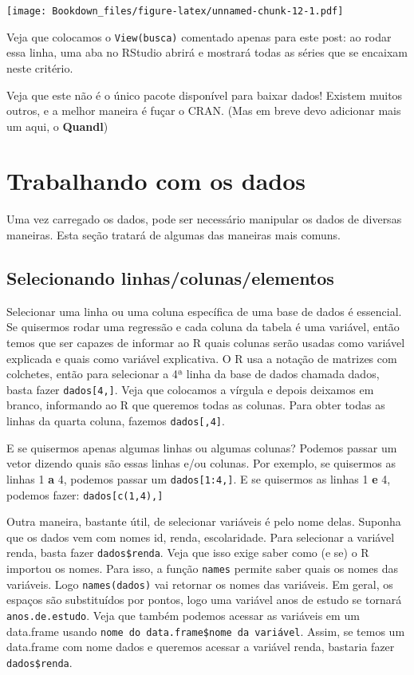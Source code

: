 \documentclass[]{book}
\begin{document}
\texttt{[image: Bookdown\_files/figure-latex/unnamed-chunk-12-1.pdf]}

Veja que colocamos o \texttt{View(busca)} comentado apenas para este
post: ao rodar essa linha, uma aba no RStudio abrirá e mostrará todas as
séries que se encaixam neste critério.

Veja que este não é o único pacote disponível para baixar dados! Existem
muitos outros, e a melhor maneira é fuçar o CRAN. (Mas em breve devo
adicionar mais um aqui, o \textbf{Quandl})

\section{Trabalhando com os dados}\label{trabalhando-com-os-dados}

Uma vez carregado os dados, pode ser necessário manipular os dados de
diversas maneiras. Esta seção tratará de algumas das maneiras mais
comuns.

\subsection{Selecionando
linhas/colunas/elementos}\label{selecionando-linhascolunaselementos}

Selecionar uma linha ou uma coluna específica de uma base de dados é
essencial. Se quisermos rodar uma regressão e cada coluna da tabela é
uma variável, então temos que ser capazes de informar ao R quais colunas
serão usadas como variável explicada e quais como variável explicativa.
O R usa a notação de matrizes com colchetes, então para selecionar a 4ª
linha da base de dados chamada dados, basta fazer
\texttt{dados{[}4,{]}}. Veja que colocamos a vírgula e depois deixamos
em branco, informando ao R que queremos todas as colunas. Para obter
todas as linhas da quarta coluna, fazemos \texttt{dados{[},4{]}}.

E se quisermos apenas algumas linhas ou algumas colunas? Podemos passar
um vetor dizendo quais são essas linhas e/ou colunas. Por exemplo, se
quisermos as linhas 1 \textbf{a} 4, podemos passar um
\texttt{dados{[}1:4,{]}}. E se quisermos as linhas 1 \textbf{e} 4,
podemos fazer: \texttt{dados{[}c(1,4),{]}}

Outra maneira, bastante útil, de selecionar variáveis é pelo nome delas.
Suponha que os dados vem com nomes id, renda, escolaridade. Para
selecionar a variável renda, basta fazer \texttt{dados\$renda}. Veja que
isso exige saber como (e se) o R importou os nomes. Para isso, a função
\texttt{names} permite saber quais os nomes das variáveis. Logo
\texttt{names(dados)} vai retornar os nomes das variáveis. Em geral, os
espaços são substituídos por pontos, logo uma variável anos de estudo se
tornará \texttt{anos.de.estudo}. Veja que também podemos acessar as
variáveis em um data.frame usando
\texttt{nome\ do\ data.frame\$nome\ da\ variável}. Assim, se temos um
data.frame com nome dados e queremos acessar a variável renda, bastaria
fazer \texttt{dados\$renda}.
\end{document}
